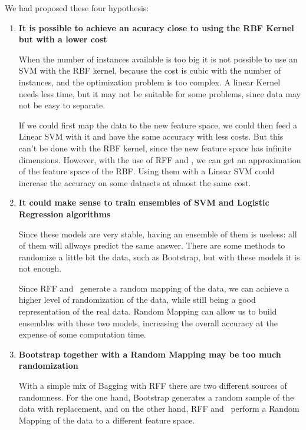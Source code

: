 \begin{pre-delivery}
  We had proposed these four hypothesis:
  \begin{enumerate}
    \item \textbf{It is possible to achieve an acuracy close to using the
    RBF Kernel but with a lower cost}

    When the number of instances available is too big it is not possible to
    use an SVM with the RBF kernel, because the cost is cubic with the
    number of instances, and the optimization problem is too complex. A linear
    Kernel needs less time, but it may not be suitable for some problems,
    since data may not be easy to separate.

    If we could first map the data to the new feature space, we could then feed
    a Linear SVM with it and have the same accuracy with less costs. But this
    can't be done with the RBF kernel, since the new feature space has infinite
    dimensions. However, with the use of RFF and \Nys, we can get an approximation
    of the feature space of the RBF. Using them with a Linear SVM could
    increase the accuracy on some datasets at almost the same cost.

    \item \textbf{It could make sense to train ensembles of SVM and Logistic
    Regression algorithms}

    Since these models are very stable, having an ensemble of them is useless:
    all of them will allways predict the same answer. There are some
    methods to randomize a little bit the data, such as Bootstrap, but with
    these models it is not enough.

    Since RFF and \Nys\ generate a random mapping of the data, we can achieve
    a higher level of randomization of the data, while still being a good
    representation of the real data. Random Mapping can allow us to build
    ensembles with these two models, increasing the overall accuracy at the
    expense of some computation time.

    \item \textbf{Bootstrap together with a Random Mapping may be too much
    randomization}

    With a simple mix of Bagging with RFF there are two different sources
    of randomness. For the one hand, Bootstrap generates a random sample of
    the data with replacement, and on the other hand, RFF and \Nys\ perform
    a Random Mapping of the data to a different feature space.


\end{enumerate}
\end{pre-delivery}
